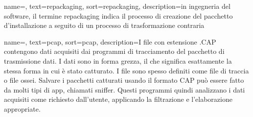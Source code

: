 







{
name=,
text=repackaging,
sort=repackaging,
description={in ingegneria del software, il termine repackaging indica il processo di creazione del pacchetto d'installazione a seguito di un processo di trasformazione contraria}
}

{
name=,
text=pcap,
sort=pcap,
description={I file con estensione .CAP contengono dati acquisiti dai programmi di tracciamento del pacchetto di trasmissione dati. I dati sono in forma grezza, il che significa esattamente la stessa forma in cui è stato catturato.
I file sono spesso definiti come file di traccia o file ossei. Salvare i pacchetti catturati usando il formato CAP può essere fatto da molti tipi di app, chiamati sniffer. Questi programmi quindi analizzano i dati acquisiti come richiesto dall'utente, applicando la filtrazione e l'elaborazione appropriate.}
}

